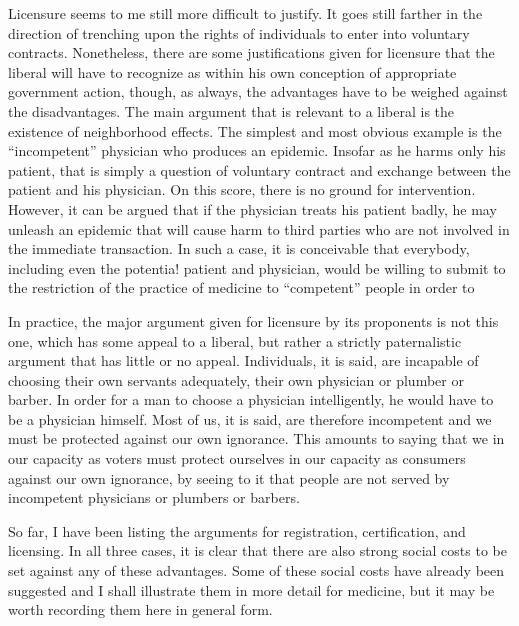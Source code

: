 \documentclass[11pt,openany]{book}
\begin{document}
Licensure seems to me still more difficult to justify. It goes still farther in the direction of trenching upon the rights of individuals to enter into voluntary contracts. Nonetheless, there are some justifications given for licensure that the liberal will have to recognize as within his own conception of appropriate government action, though, as always, the advantages have to be weighed against the disadvantages. The main argument that is relevant to a liberal is the existence of neighborhood effects. The simplest and most obvious example is the ``incompetent'' physician who produces an epidemic. Insofar as he harms only his patient, that is simply a question of voluntary contract and exchange between the patient and his physician. On this score, there is no ground for intervention. However, it can be argued that if the physician treats his patient badly, he may unleash an epidemic that will cause harm to third parties who are not involved in the immediate transaction. In such a case, it is conceivable that everybody, including even the potentia! patient and physician, would be willing to submit to the restriction of the practice of medicine to ``competent'' people in order to

In practice, the major argument given for licensure by its proponents is not this one, which has some appeal to a liberal, but rather a strictly paternalistic argument that has little or no appeal. Individuals, it is said, are incapable of choosing their own servants adequately, their own physician or plumber or barber. In order for a man to choose a physician intelligently, he would have to be a physician himself. Most of us, it is said, are therefore incompetent and we must be protected against our own ignorance. This amounts to saying that we in our capacity as voters must protect ourselves in our capacity as consumers against our own ignorance, by seeing to it that people are not served by incompetent physicians or plumbers or barbers.

So far, I have been listing the arguments for registration, certification, and licensing. In all three cases, it is clear that there are also strong social costs to be set against any of these advantages. Some of these social costs have already been suggested and I shall illustrate them in more detail for medicine, but it may be worth recording them here in general form.
\end{document}
